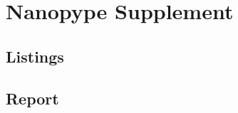 \chapter{Nanopype Supplement}
\label{cha:supplement:nanopype}

\section{Listings}
\label{sec:supplement:nanopype:listings}


%

%




\section{Report}
\label{sec:supplement:nanopype:report}


